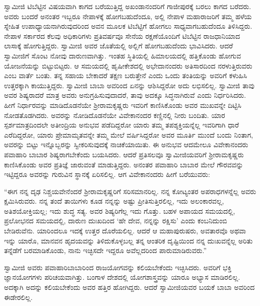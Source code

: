 \newpage

 ಸ್ವಾಮೀಜಿ ಟಿಬೆಟ್ಟಿನ ವಿಷಯವಾಗಿ ಕಾಗದ ಬರೆಯುತ್ತಿದ್ದ ಅಖಂಡಾನಂದರಿಗೆ ಗಾಜೀಪುರಕ್ಕೆ ಬರಲು ಕಾಗದ ಬರೆದರು. ಅವರು ಬಂದರೆ ಅನಂತರ ಇಬ್ಬರೂ ನೇಪಾಳಕ್ಕೆ ಹೋಗಬಹುದೆಂದೂ, ಅಲ್ಲಿ ನೇಪಾಳ ಮಹಾರಾಜರಿಗೆ ತಮ್ಮ ಹಳೆಯ ಸ್ನೇಹಿತ ಉಪಾಧ್ಯಾಯನಾಗಿರುವುದರಿಂದ ಅವನ ಮೂಲಕ ಟಿಬೆಟ್ಟಿಗೆ ಹೋಗಲು ಸಾಧ್ಯವಾಗಬಹುದೆಂದೂ ತಿಳಿಸಿದ್ದರು. ನೇಪಾಳ ಸರ್ಕಾರದ ಕೆಲವು ಅಧಿಕಾರಿಗಳು ಪ್ರತಿವರ್ಷವೂ ಸೇನೆಯ ರಕ್ಷಣೆಯೊಂದಿಗೆ ಟಿಬೆಟ್ಟಿನ ರಾಜಧಾನಿಯಾದ ಲಾಸಾಕ್ಕೆ ಹೋಗುತ್ತಿದ್ದರು. ಸ್ವಾಮೀಜಿ ಅವರ ಜೊತೆಯಲ್ಲಿ ಅಲ್ಲಿಗೆ ಹೋಗಬಹುದೆಂದು ಭಾವಿಸಿದರು. ಆದರೆ ಸ್ವಾಮೀಜಿಗೆ ಸೊಂಟ ನೋವು ದಾರುಣವಾಗಿತ್ತು. ಇಂತಹ ಸ್ಥಿತಿಯಲ್ಲಿ ಹಿಮಾಲಯದಲ್ಲಿ ಹತ್ತಿಕೊಂಡು ಹೋಗುವ ಯೋಜನೆಯನ್ನು ಬಿಟ್ಟುಬಿಟ್ಟರು. ಆ ಸಮಯದಲ್ಲಿ ಹೃಷೀಕೇಶದಲ್ಲಿ ಅಭೇದಾನಂದರು ಅತಿಸಾರದಿಂದ ನರಳುತ್ತಿರುವರು ಎಂಬ ವಾರ್ತೆ ಬಂತು. ತನ್ನ ಸಹಾಯ ಬೇಕಾದರೆ ತಕ್ಷಣ ಬರುತ್ತೇನೆ ಎಂದು ಒಂದು ತಂತಿಯನ್ನು ಅವರಿಗೆ ಕಳುಹಿಸಿ ಉತ್ತರಕ್ಕಾಗಿ ಕಾಯುತ್ತಿದ್ದರು. ಸ್ವಾಮೀಜಿ ಬಾಬಾ ಅವರಿಂದ ಏನನ್ನು ಆಶಿಸಿದ್ದರೋ ಅದು ಲಭಿಸಲಿಲ್ಲ. ಸ್ವಾಮೀಜಿ ತಾವು ಅವರ ಶಿಷ್ಯರಾದರೆ ಮಾತ್ರ ಅವರು ಅನುಗ್ರಹಿಸುವುದಾದರೆ, ತಾವು ಅದಕ್ಕೂ ಸಿದ್ಧನಾಗಿರುವೆ ಎಂದು ನಿರ್ಧರಿಸಿದರು. ಹೀಗೆ ನಿರ್ಧಾರವನ್ನು ಮಾಡಿದೊಡನೆಯೇ ಶ‍್ರೀರಾಮಕೃಷ್ಣರು ಇವರಿಗೆ ಕಾಣಿಸಿಕೊಂಡು ಅವರ ಮುಖವನ್ನೇ ದಿಟ್ಟಿಸಿ ನೋಡತೊಡಗಿದರು. ಅವರನ್ನು ನೋಡಿದೊಡನೆಯೇ ವಿವೇಕಾನಂದರ ಕಣ್ಣಿನಲ್ಲಿ ನೀರು ಬಂದಿತು. ಯಾರ ಸ್ಪರ್ಶಮಾತ್ರದಿಂದಲೇ ಅತೀಂದ್ರಿಯ ಅನುಭವ ಪಡೆದಿದ್ದರೋ ಯಾರು ತಮ್ಮ ತಪಶ್ಶಕ್ತಿಯನ್ನೆಲ್ಲ ಇವರಿಗಾಗಿ ಧಾರೆ ಎರೆದಿದ್ದರೋ, ಯಾರು ಪ್ರೇಮಾಮೃತವನ್ನೇ ತಮ್ಮ ಮೇಲೆ ವರ್ಷಿಸಿದ್ದರೋ ಅವರ ಮೂರ್ತಿ ಮುಂದೆ ಬಂದು ನಿಂತಾಗ, ಅವರನ್ನು ಬಿಟ್ಟು ಇನ್ನೊಬ್ಬರನ್ನು ಸ್ವೀಕರಿಸುವುದಕ್ಕೆ ನಾಚಿಕೆಯಾಯಿತು. ಈ ಅನುಭವ ಆದಮೇಲೂ ವಿವೇಕಾನಂದರು ಪವಾಹಾರಿ ಬಾಬಾರ ಶಿಷ್ಯರಾಗಬೇಕೆಂದು ಬಯಸಿದರು. ಆದರೆ ಪ್ರತಿಸಲವೂ ಸ್ವಾಮೀಜಿಯವರಿಗೆ ಶ‍್ರೀರಾಮಕೃಷ್ಣರು ಕಾಣಿಸಿಕೊಂಡು ಅವರ ಪ್ರತಿಜ್ಞೆ ಜಾರುವಂತೆ ಮಾಡುತ್ತಿದ್ದರು. ಅನಂತರ ಪವಾಹಾರಿ ಬಾಬಾರ ಮೇಲೆ ಗೌರವವನ್ನು ಇಟ್ಟಿದ್ದರೂ ಅವರನ್ನು ಗುರುವಿನ ಸ್ಥಾನಕ್ಕೆ ಏರಿಸಲಿಲ್ಲ. ಆಗ ವಿವೇಕಾನಂದರು ಹೀಗೆ ಬರೆಯುವರು: 

 “ಈಗ ನನ್ನ ದೃಢ ನಿಶ್ಚಯವೇನೆಂದರೆ ಶ‍್ರೀರಾಮಕೃಷ್ಣರಿಗೆ ಸರಿಸಮಾನರಿಲ್ಲ. ನನ್ನ ಕೋಟ್ಯಂತರ ಅಪರಾಧಗಳನ್ನೆಲ್ಲ ಅವರು ಕ್ಷಮಿಸಿರುವರು. ನನ್ನ ತಂದೆ ತಾಯಿಗಳು ಕೂಡ ನನ್ನನ್ನು ಅಷ್ಟು ಪ್ರೀತಿಸುತ್ತಿರಲಿಲ್ಲ, ಇದು ಅಲಂಕಾರವಲ್ಲ, ಅತಿಶಯೋಕ್ತಿಯಲ್ಲ; ಇದು ಶುದ್ಧ ಸತ್ಯ. ಅವರ ಶಿಷ್ಯರಿಗೆಲ್ಲ ಇದು ಗೊತ್ತು. ಬಹಳ ಅಪಾಯದ ಸಮಯದಲ್ಲಿ, ಪ್ರಲೋಭನದ ಸಮಯದಲ್ಲಿ, ದಾರುಣ ದುಃಖದಿಂದ ‘ಹೇ ದೇವ, ನನ್ನನ್ನು ರಕ್ಷಿಸು’ ಎಂದು ಕಂಬನಿದುಂಬಿ ಬೇಡಿರುವೆನು. ಯಾರಿಂದಲೂ ಇದಕ್ಕೆ ಉತ್ತರ ದೊರೆಯಲಿಲ್ಲ. ಆದರೆ ಆ ಮಹಾಪುರುಷರು, ಅವತಾರವೊ ಅಥವಾ ಇನ್ನು ಯಾರೊ, ಮಾನವನ ಹೃದಯವನ್ನು ತಿಳಿದುಕೊಳ್ಳಬಲ್ಲ ತನ್ನ ಆಂತರಿಕ ದೃಷ್ಟಿಯಿಂದ ನನ್ನ ದುಃಖವನ್ನೆಲ್ಲ ಅರಿತು ತನ್ನೆಡೆಗೆ ಬರಮಾಡಿಕೊಂಡು, ನಾನು ಇಚ್ಛಿಸದೇ ಇದ್ದರೂ ಅವೆಲ್ಲದರಿಂದ ಪಾರುಮಾಡಿರುವರು.” 

 ಸ್ವಾಮೀಜಿ ಅವರು ಪವಾಹಾರಿಬಾಬಾರಿಂದ ರಾಜಯೋಗವನ್ನು ಕಲಿಯಬೇಕೆಂದು ಇಚ್ಛಿಸಿದರು. ಅವರಿಗೆ ಭಕ್ತಿ ಜ್ಞಾನಯೋಗಗಳು ಪರಿಚಯವಾಗಿತ್ತು. ಬಂಗಾಳ ದೇಶದಲ್ಲಿ ಯೋಗಶಾಸ್ತ್ರವನ್ನು ಯಾರೂ ಅಭ್ಯಾಸ ಮಾಡಿರಲಿಲ್ಲ. ಅದಕ್ಕಾಗಿ ಅದನ್ನು ಕಲಿಯಬೇಕೆಂದು ಅವರ ಹತ್ತಿರ ಹೋಗಿದ್ದರು. ಆದರೆ ಸ್ವಾಮೀಜಿಯವರ ಬಯಕೆ ಬಾಬಾ ಅವರಿಂದ ಈಡೇರಲಿಲ್ಲ. 

